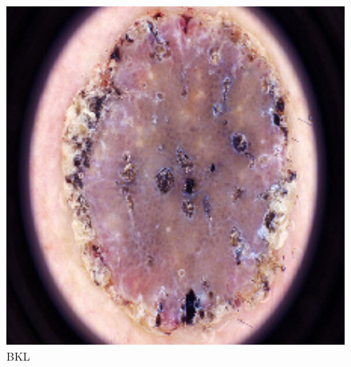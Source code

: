 \begin{figure}
    \begin{minipage}[b] {0.32\textwidth}
        \includegraphics[width=1\textwidth]{Images/bkl.png}
        \caption{BKL}
    \end{minipage} 

    
\end{figure}
